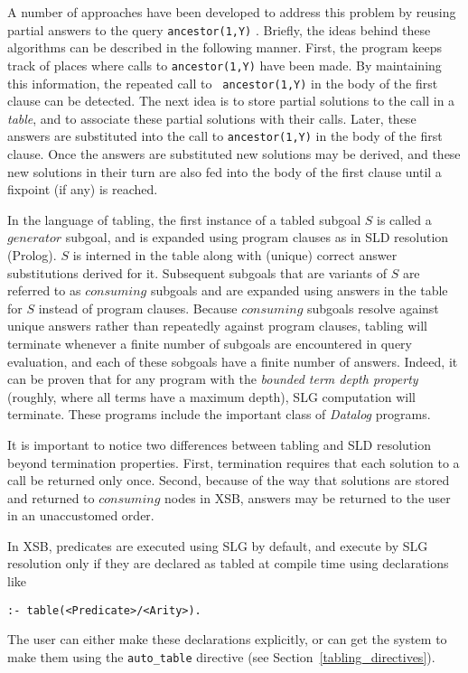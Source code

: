 A number of approaches have been developed to address this problem by
reusing partial answers to the query {\tt ancestor(1,Y)}
\cite{Diet87,TaSa86,BMSU86,Viei89,Walk93}. Briefly, the ideas behind
these algorithms can be described in the following manner.  First, the
program keeps track of places where calls to {\tt ancestor(1,Y)} have
been made.  By maintaining this information, the repeated call to {\tt
ancestor(1,Y)} in the body of the first clause can be detected.  The
next idea is to store partial solutions to the call in a {\em table},
and to associate these partial solutions with their calls.  Later,
these answers are substituted into the call to {\tt ancestor(1,Y)} in
the body of the first clause.  Once the answers are substituted new
solutions may be derived, and these new solutions in their turn are
also fed into the body of the first clause until a fixpoint (if any)
is reached.  


In the language of tabling, the first instance of a tabled subgoal $S$
is called a $generator$ subgoal, and is expanded using program clauses
as in SLD resolution (Prolog).  $S$ is interned in the table along
with (unique) correct answer substitutions derived for it.  Subsequent
subgoals that are variants of $S$ are referred to as $consuming$
subgoals and are expanded using answers in the table for $S$ instead
of program clauses.  Because $consuming$ subgoals resolve against
unique answers rather than repeatedly against program clauses, tabling
will terminate whenever a finite number of subgoals are encountered in
query evaluation, and each of these sobgoals have a finite number of
answers.  Indeed, it can be proven that for any program with the {\em
bounded term depth property} (roughly, where all terms have a maximum
depth), SLG computation will terminate.  These programs include the
important class of {\em Datalog} programs.

It is important to notice two differences between tabling and SLD
resolution beyond termination properties.  First, termination requires
that each solution to a call be returned only once.  Second, because
of the way that solutions are stored and returned to $consuming$ nodes
in XSB, answers may be returned to the user in an unaccustomed order.

In XSB, predicates are executed using SLG by default, and execute by
SLG resolution only if they are declared as tabled at compile time
using declarations like
\begin{center}
{\tt :- table(<Predicate>/<Arity>).}
\end{center}
The user can either make these declarations explicitly, or can get the
system to make them using the {\tt auto\_table} directive (see
Section~\ref{tabling_directives}).

